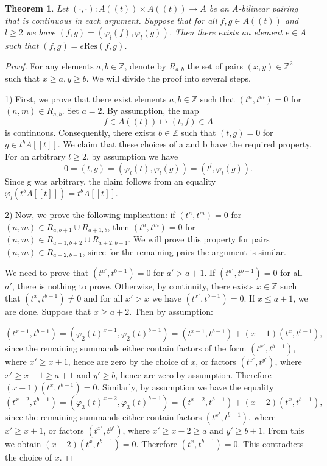 \documentclass[11pt,a4paper]{article}
\theoremstyle{plain}
\newtheorem{theorem}{Theorem}
\newcommand{\res}{\mathrm{Res}}
\newcommand{\Z}{\mathbb{Z}}
\begin{document}
\begin{theorem}
	Let $(\cdot, \cdot) \colon A((t)) \times A((t)) \to A$ be an $A$-bilinear
	pairing that is continuous in each argument.
	Suppose that for all $f,g \in A((t))$ and $l \geq 2$ we have
	$(f,g) = (\varphi_l(f), \varphi_l(g))$.
	Then there exists an element $e\in A$ such that
	$(f,g) = e \res(f, g)$.
\end{theorem}
\begin{proof}
	For any elements $a, b \in \Z$, denote by $R_{a,b}$
	the set of pairs $(x,y) \in \Z^2$ such that $x \geq a, y \geq b$. We will divide the proof into several steps.
	
	
		
		 1) First, we prove that there exist elements $a,b \in \Z$
		such that $(t^n, t^m) = 0$ for $(n, m) \in R_{a,b}$.
		Set $a = 2$. By assumption, the map
		$$f\in A((t)) \mapsto (t,f)\in A$$ is continuous.
		Consequently, there exists $b \in \Z$ such that
		$(t, g) = 0$ for $g \in t^{b}A[[t]]$.
		We claim that these choices of a and b have the required property.
		For an arbitrary $l \geq 2$, by assumption we have
		$$ 0 = (t, g) = (\varphi_{l}(t), \varphi_{l}(g)) = (t^l, \varphi_{l}(g)).$$
		Since g was arbitrary, the claim follows from an equality $\varphi_l(t^{b}A[[t]]) = t^{b}A[[t]]$.
		
		 2) Now, we prove the following implication:
		if $(t^n, t^m) = 0$ for $(n,m) \in R_{a, b+1} \cup R_{a+1, b}$,
		then $(t^n, t^m) = 0$ for $(n,m) \in R_{a-1, b+2} \cup R_{a+2, b-1}$.
We will prove this property for pairs $(n,m) \in R_{a+2, b-1}$,
since for the remaining pairs the argument is similar.

		We need to prove that $(t^{a'}, t^{b-1}) = 0$ for $a' > a+1$.
		If $(t^{a'}, t^{b-1}) = 0$ for all $a'$, there is nothing to prove.
		Otherwise, by continuity, there exists $x \in \Z$
		such that $(t^{x}, t^{b-1}) \neq 0$ and for all $x' > x$
		we have $(t^{x'}, t^{b-1}) = 0$.
		If $x \leq a+1$, we are done.
		Suppose that $x \geq a + 2$. Then by assumption:
		
		$$(t^{x-1}, t^{b-1}) = (\varphi_2(t)^{x-1}, \varphi_2(t)^{b-1}) = (t^{x-1}, t^{b-1}) + (x-1)(t^{x}, t^{b-1}), $$
		since the remaining summands either contain factors of the form
		$(t^{x'}, t^{b-1})$, where $x' \geq x+1$, hence
		are zero by the choice of $x$, or factors $(t^{x'}, t^{y'})$,
		where $x' \geq x-1 \geq a + 1$ and $y' \geq b$, hence
		are zero by assumption.
		Therefore $(x-1)(t^{x}, t^{b-1}) = 0$.
		Similarly, by assumption we have the equality
		$$ (t^{x-2}, t^{b-1}) = (\varphi_3(t)^{x-2}, \varphi_3(t)^{b-1}) = (t^{x-2}, t^{b-1}) + (x-2)(t^{x}, t^{b-1}), $$
		since the remaining summands either contain factors
		$(t^{x'}, t^{b-1})$, where $x' \geq x+1$, or factors
		$(t^{x'}, t^{y'})$, where $x' \geq x-2 \geq a$ and $y' \geq b+1$.
		From this we obtain $(x-2)(t^{x}, t^{b-1}) = 0$.
		Therefore $(t^{x}, t^{b-1}) = 0$.
		This contradicts the choice of $x$.
		


\end{proof}
\end{document}
